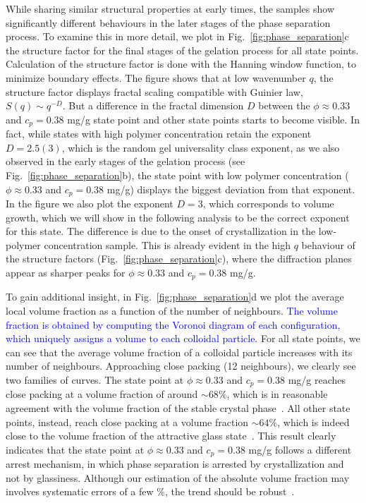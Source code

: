 \documentclass[preprint,amsmath,amssymb,superscriptaddress]{revtex4-1}
\begin{document}
While sharing similar structural properties at early times, the samples show significantly different behaviours in the later stages of the phase separation process.
To examine this in more detail, we plot in Fig.~\ref{fig:phase_separation}c the structure factor for the final stages of the gelation process for all state points.
Calculation of the structure factor is done with the Hanning window function, to minimize boundary effects.
The figure shows that at low wavenumber $q$, the structure factor displays fractal scaling compatible with Guinier law, $S(q)\sim q^{-D}$.
But a difference in the fractal dimension $D$ between the $\phi\approx 0.33$ and $c_p=0.38$ mg/g state point and other state points starts to become visible. In fact, while states
with high polymer concentration retain the exponent $D=2.5(3)$, 
which is the random gel universality class exponent, as we also observed in the early stages of the gelation process (see Fig.~\ref{fig:phase_separation}b),
the state point with low polymer concentration ($\phi\approx 0.33$ and $c_p=0.38$ mg/g) displays the biggest deviation from that exponent. In the figure we also
plot the exponent $D=3$, which corresponds to volume growth, which we will show in the following analysis to be the correct exponent for this state. 
The difference is due to the onset of crystallization in the low-polymer concentration sample. This is already evident in the high $q$ behaviour of
the structure factors (Fig.~\ref{fig:phase_separation}c), where the diffraction planes appear as sharper peaks for $\phi\approx 0.33$ and $c_p=0.38$ mg/g.

To gain additional insight, in Fig.~\ref{fig:phase_separation}d we plot the average local volume fraction as a function of the number of neighbours.
\textcolor{blue}{The volume fraction is obtained by computing the Voronoi diagram of each configuration,
which uniquely assigns a volume to each colloidal particle.}
For all state points, we can see that the average volume fraction of a colloidal
particle increases with its number of neighbours. Approaching close packing (12 neighbours), we clearly see two families of curves. The state point
at $\phi\approx 0.33$ and $c_p=0.38$ mg/g reaches close packing at a volume fraction of around $\sim 68\%$, which is in reasonable agreement with the
volume fraction of the stable crystal phase~\cite{ilett1995phase}. All other state points, instead, reach close packing at a volume fraction $\sim 64\%$, which is
indeed close to the volume fraction of the attractive glass state~\cite{pham2002multiple}. 
This result clearly indicates that the state point at $\phi\approx 0.33$ and $c_p=0.38$ mg/g follows a different arrest mechanism, in which phase separation
is arrested by crystallization and not by glassiness. Although our estimation of the absolute volume fraction may involves systematic errors of a few \%, the trend should be robust~\cite{Poon2012}.
\end{document}
